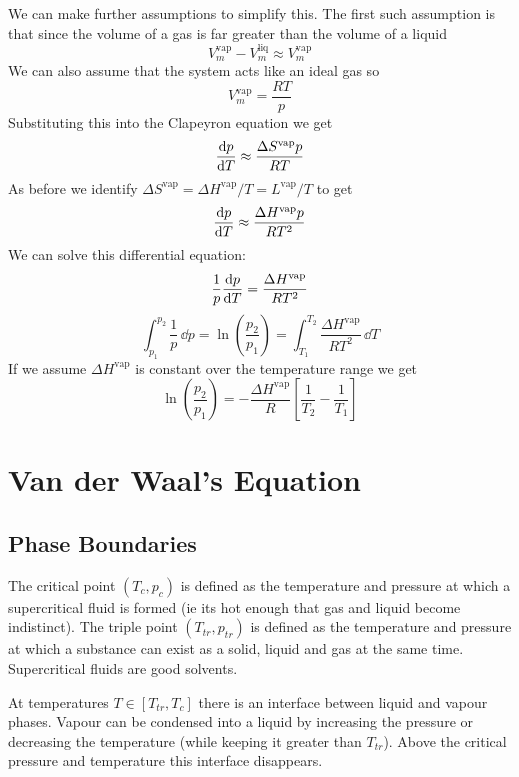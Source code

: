 \documentclass{article}
\begin{document}
    We can make further assumptions to simplify this.
    The first such assumption is that since the volume of a gas is far greater than the volume of a liquid
    \[V_m^\text{vap} - V_m^\text{liq} \approx V_m^\text{vap}\]
    We can also assume that the system acts like an ideal gas so
    \[V_m^\text{vap} = \frac{RT}{p}\]
    Substituting this into the Clapeyron equation we get
    \[\dv{p}{T} \approx \frac{\Delta S^\text{vap}p}{RT}\]
    As before we identify \(\Delta S^\text{vap} = \Delta H^\text{vap}/T = L^\text{vap}/T\) to get
    \[\dv{p}{T} \approx \frac{\Delta H^\text{vap}p}{RT^2}\]
    We can solve this differential equation:
    \[\frac{1}{p}\dv{p}{T} = \frac{\Delta H^\text{vap}}{RT^2}\]
    \[\int_{p_1}^{p_2}\frac{1}{p}\,\dd p = \ln\left(\frac{p_2}{p_1}\right) = \int_{T_1}^{T_2}\frac{\Delta H^\text{vap}}{RT^2}\,\dd T\]
    If we assume \(\Delta H^\text{vap}\) is constant over the temperature range we get
    \[\ln\left(\frac{p_2}{p_1}\right) = -\frac{\Delta H^\text{vap}}{R}\left[\frac{1}{T_2} - \frac{1}{T_1}\right]\]
    
    \section{Van der Waal's Equation}
    \subsection{Phase Boundaries}
    The critical point \((T_c, p_c)\) is defined as the temperature and pressure at which a supercritical fluid is formed (ie its hot enough that gas and liquid become indistinct).
    The triple point \((T_{tr}, p_{tr})\) is defined as the temperature and pressure at which a substance can exist as a solid, liquid and gas at the same time.
    Supercritical fluids are good solvents.
    
    At temperatures \(T\in[T_{tr}, T_c]\) there is an interface between liquid and vapour phases.
    Vapour can be condensed into a liquid by increasing the pressure or decreasing the temperature (while keeping it greater than \(T_{tr}\)).
    Above the critical pressure and temperature this interface disappears.
    
\end{document}
